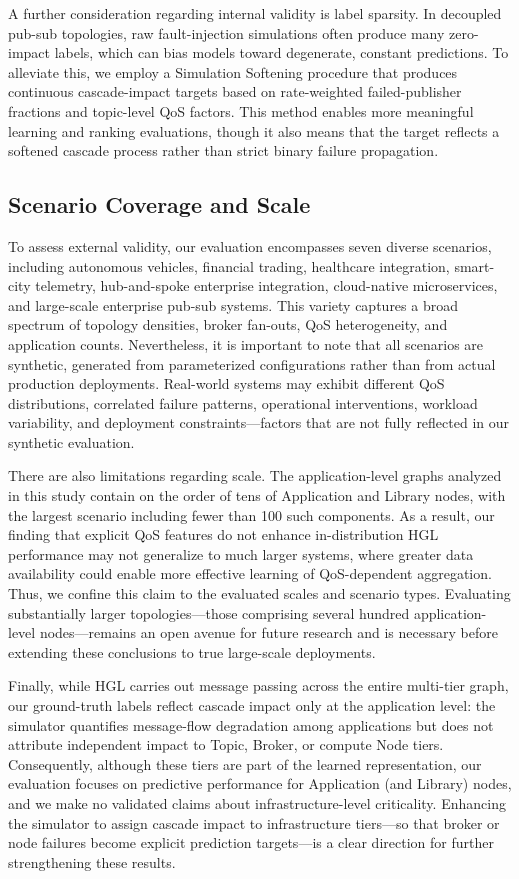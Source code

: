 \documentclass[sigconf,9pt,anonymous]{acmart}
\begin{document}
A further consideration regarding internal validity is label sparsity. In decoupled pub-sub topologies, raw fault-injection simulations often produce many zero-impact labels, which can bias models toward degenerate, constant predictions. To alleviate this, we employ a Simulation Softening procedure that produces continuous cascade-impact targets based on rate-weighted failed-publisher fractions and topic-level QoS factors. This method enables more meaningful learning and ranking evaluations, though it also means that the target reflects a softened cascade process rather than strict binary failure propagation.

\subsection{Scenario Coverage and Scale}

To assess external validity, our evaluation encompasses seven diverse scenarios, including autonomous vehicles, financial trading, healthcare integration, smart-city telemetry, hub-and-spoke enterprise integration, cloud-native microservices, and large-scale enterprise pub-sub systems. This variety captures a broad spectrum of topology densities, broker fan-outs, QoS heterogeneity, and application counts. Nevertheless, it is important to note that all scenarios are synthetic, generated from parameterized configurations rather than from actual production deployments. Real-world systems may exhibit different QoS distributions, correlated failure patterns, operational interventions, workload variability, and deployment constraints—factors that are not fully reflected in our synthetic evaluation.

There are also limitations regarding scale. The application-level graphs analyzed in this study contain on the order of tens of Application and Library nodes, with the largest scenario including fewer than 100 such components. As a result, our finding that explicit QoS features do not enhance in-distribution HGL performance may not generalize to much larger systems, where greater data availability could enable more effective learning of QoS-dependent aggregation. Thus, we confine this claim to the evaluated scales and scenario types. Evaluating substantially larger topologies—those comprising several hundred application-level nodes—remains an open avenue for future research and is necessary before extending these conclusions to true large-scale deployments.



Finally, while HGL carries out message passing across the entire multi-tier graph, our ground-truth labels reflect cascade impact only at the application level: the simulator quantifies message-flow degradation among applications but does not attribute independent impact to Topic, Broker, or compute Node tiers. Consequently, although these tiers are part of the learned representation, our evaluation focuses on predictive performance for Application (and Library) nodes, and we make no validated claims about infrastructure-level criticality. Enhancing the simulator to assign cascade impact to infrastructure tiers—so that broker or node failures become explicit prediction targets—is a clear direction for further strengthening these results.
\end{document}

